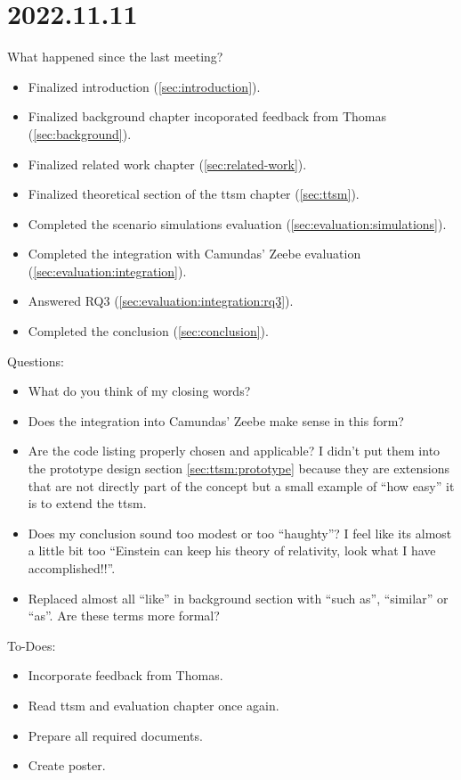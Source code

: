 \section{2022.11.11}
What happened since the last meeting?
\begin{itemize}
    \item Finalized introduction (\ref{sec:introduction}).
    \item Finalized background chapter incoporated feedback from Thomas (\ref{sec:background}).
    \item Finalized related work chapter (\ref{sec:related-work}).
    \item Finalized theoretical section of the \gls{ttsm} chapter (\ref{sec:ttsm}).
    \item Completed the scenario simulations evaluation (\ref{sec:evaluation:simulations}).
    \item Completed the integration with Camundas' Zeebe evaluation (\ref{sec:evaluation:integration}).
    \item Answered RQ3 (\ref{sec:evaluation:integration:rq3}).
    \item Completed the conclusion (\ref{sec:conclusion}).
\end{itemize}

Questions:
\begin{itemize}
    \item What do you think of my closing words?
    \item Does the integration into Camundas' Zeebe make sense in this form?
    \item Are the code listing properly chosen and applicable? I didn't put them into the prototype design section \ref{sec:ttsm:prototype} because they are extensions that are not directly part of the concept but a small example of ``how easy'' it is to extend the \gls{ttsm}.
    \item Does my conclusion sound too modest or too ``haughty''? I feel like its almost a little bit too ``Einstein can keep his theory of relativity, look what I have accomplished!!''.
    \item Replaced almost all ``like'' in background section with ``such as'', ``similar'' or ``as''. Are these terms more formal?
\end{itemize}

To-Does:
\begin{itemize}
    \item Incorporate feedback from Thomas.
    \item Read \gls{ttsm} and evaluation chapter once again.
    \item Prepare all required documents.
    \item Create poster.
\end{itemize}


